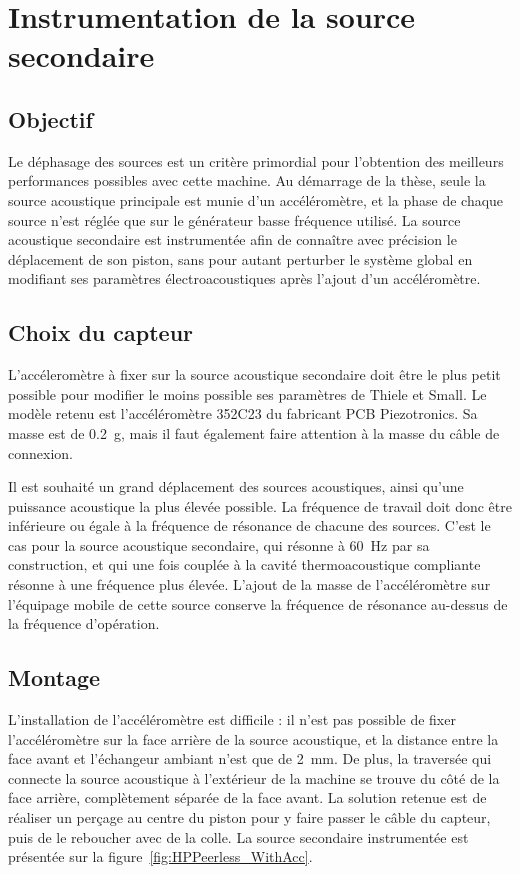 \chapter{Instrumentation de la source secondaire}\label{chap:InstrumHP}
\section{Objectif}
Le déphasage des sources est un critère primordial pour l'obtention des meilleurs performances possibles avec cette machine. Au démarrage de la thèse, seule la source acoustique principale est munie d'un accéléromètre, et la phase de chaque source n'est réglée que sur le générateur basse fréquence utilisé. La source acoustique secondaire est instrumentée afin de connaître avec précision le déplacement de son piston, sans pour autant perturber le système global en modifiant ses paramètres électroacoustiques après l'ajout d'un accéléromètre.

\section{Choix du capteur}
L'accéleromètre à fixer sur la source acoustique secondaire doit être le plus petit possible pour modifier le moins possible ses paramètres de Thiele et Small. Le modèle retenu est l'accéléromètre 352C23 du fabricant PCB Piezotronics. Sa masse est de \qty{.2}{\gram}, mais il faut également faire attention à la masse du câble de connexion. 

Il est souhaité un grand déplacement des sources acoustiques, ainsi qu'une puissance acoustique la plus élevée possible. La fréquence de travail doit donc être inférieure ou égale à la fréquence de résonance de chacune des sources. C'est le cas pour la source acoustique secondaire, qui résonne à \qty{60}{\hertz} par sa construction, et qui une fois couplée à la cavité thermoacoustique compliante résonne à une fréquence plus élevée. L'ajout de la masse de l'accéléromètre sur l'équipage mobile de cette source conserve la fréquence de résonance au-dessus de la fréquence d'opération.


\section{Montage}
L'installation de l'accéléromètre est difficile : il n'est pas possible de fixer l'accéléromètre sur la face arrière de la source acoustique, et la distance entre la face avant et l'échangeur ambiant n'est que de \qty{2}{\milli\meter}. De plus, la traversée qui connecte la source acoustique à l'extérieur de la machine se trouve du côté de la face arrière, complètement séparée de la face avant. La solution retenue est de réaliser un perçage au centre du piston pour y faire passer le câble du capteur, puis de le reboucher avec de la colle. La source secondaire instrumentée est présentée sur la figure~\ref{fig:HPPeerless_WithAcc}.

